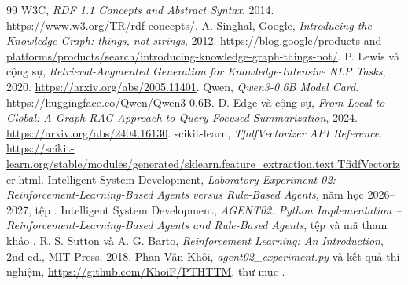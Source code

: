 \documentclass[12pt,a4paper]{report}
\begin{document}
\begin{thebibliography}{99}
 W3C, \textit{RDF 1.1 Concepts and Abstract Syntax}, 2014.
\url{https://www.w3.org/TR/rdf-concepts/}.
 A. Singhal, Google, \textit{Introducing the Knowledge Graph: things, not strings}, 2012.
\url{https://blog.google/products-and-platforms/products/search/introducing-knowledge-graph-things-not/}.
 P. Lewis và cộng sự, \textit{Retrieval-Augmented Generation for Knowledge-Intensive NLP Tasks}, 2020.
\url{https://arxiv.org/abs/2005.11401}.
 Qwen, \textit{Qwen3-0.6B Model Card}.
\url{https://huggingface.co/Qwen/Qwen3-0.6B}.
 D. Edge và cộng sự, \textit{From Local to Global: A Graph RAG Approach to Query-Focused Summarization}, 2024.
\url{https://arxiv.org/abs/2404.16130}.
 scikit-learn, \textit{TfidfVectorizer API Reference}.
\url{https://scikit-learn.org/stable/modules/generated/sklearn.feature_extraction.text.TfidfVectorizer.html}.
 Intelligent System Development, \emph{Laboratory Experiment 02:
Reinforcement-Learning-Based Agents versus Rule-Based Agents}, năm học 2026--2027,
tệp .
 Intelligent System Development, \emph{AGENT02: Python
Implementation -- Reinforcement-Learning-Based Agents and Rule-Based Agents},
tệp  và mã tham khảo
.
 R. S. Sutton và A. G. Barto, \emph{Reinforcement Learning: An
Introduction}, 2nd ed., MIT Press, 2018.
 Phan Văn Khôi, \emph{agent02\_experiment.py} và kết quả thí nghiệm,
\url{https://github.com/KhoiF/PTHTTM}, thư mục .
\end{thebibliography}
\end{document}
